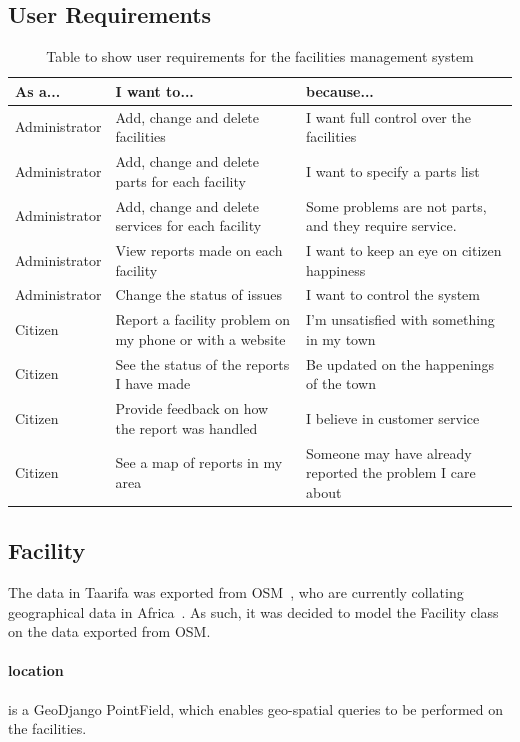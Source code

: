 \subsection{User Requirements}
\begin{table}[h]
\centering
\begin{tabular}{p{2.9cm}p{4.1cm}p{4.1cm}}
\textbf{As a...} & \textbf{I want to...} & \textbf{because...} \\
\hline
Administrator & Add, change and delete facilities & I want full control over the facilities \\
\hline
Administrator & Add, change and delete parts for each facility & I want to specify a parts list \\
\hline
Administrator & Add, change and delete services for each facility & Some problems are not parts, and they require service. \\
\hline
Administrator & View reports made on each facility & I want to keep an eye on citizen happiness \\
\hline
Administrator & Change the status of issues & I want to control the system \\
\hline
Citizen & Report a facility problem on my phone or with a website & I'm unsatisfied with something in my town \\
\hline
Citizen & See the status of the reports I have made & Be updated on the happenings of the town \\
\hline
Citizen & Provide feedback on how the report was handled & I believe in customer service \\
\hline
Citizen & See a map of reports in my area & Someone may have already reported the problem I care about \\
\end{tabular}
\caption{Table to show user requirements for the facilities management system}
\label{tab:rm:fac:req}
\end{table}

\subsection{Facility}
The data in Taarifa was exported from \gls{OSM}~\cite{openstreetmap}, who are currently collating geographical data in Africa~\cite{openstreetmapafrica}. As such, it was decided to model the Facility class on the data exported from \gls{OSM}. \\

\paragraph{location} is a GeoDjango PointField, which enables geo-spatial queries to be performed on the facilities.

